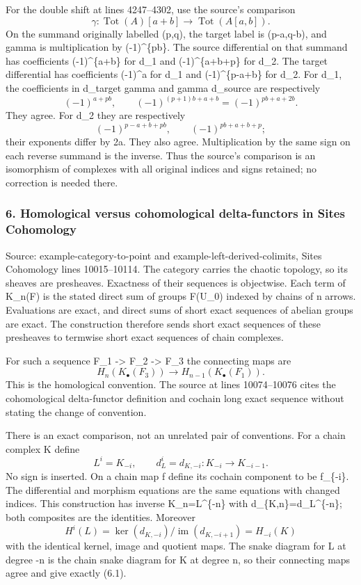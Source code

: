 \documentclass[11pt]{article}
\begin{document}
For the double shift at lines 4247--4302, use the source's comparison \[
\gamma:\operatorname{Tot}(A)[a+b]
\longrightarrow \operatorname{Tot}(A[a,b]).
\] On the summand originally labelled (p,q), the target label is (p-a,q-b), and gamma is multiplication by (-1)\^{}\{pb\}. The source differential on that summand has coefficients (-1)\^{}\{a+b\} for d\_1 and (-1)\^{}\{a+b+p\} for d\_2. The target differential has coefficients (-1)\^{}a for d\_1 and (-1)\^{}\{p-a+b\} for d\_2. For d\_1, the coefficients in d\_target gamma and gamma d\_source are respectively \[
(-1)^{a+pb},\qquad
(-1)^{(p+1)b+a+b}=(-1)^{pb+a+2b}.
\] They agree. For d\_2 they are respectively \[
(-1)^{p-a+b+pb},\qquad
(-1)^{pb+a+b+p};
\] their exponents differ by 2a. They also agree. Multiplication by the same sign on each reverse summand is the inverse. Thus the source's comparison is an isomorphism of complexes with all original indices and signs retained; no correction is needed there.

\subsubsection{6. Homological versus cohomological delta-functors in Sites Cohomology}\label{homological-versus-cohomological-delta-functors-in-sites-cohomology}

Source: example-category-to-point and example-left-derived-colimits, Sites Cohomology lines 10015--10114. The category carries the chaotic topology, so its sheaves are presheaves. Exactness of their sequences is objectwise. Each term of K\_n(F) is the stated direct sum of groups F(U\_0) indexed by chains of n arrows. Evaluations are exact, and direct sums of short exact sequences of abelian groups are exact. The construction therefore sends short exact sequences of these presheaves to termwise short exact sequences of chain complexes.

For such a sequence F\_1 -\textgreater{} F\_2 -\textgreater{} F\_3 the connecting maps are \[
H_n(K_\bullet(F_3))\longrightarrow H_{n-1}(K_\bullet(F_1)).
                                                               \tag{6.1}
\] This is the homological convention. The source at lines 10074--10076 cites the cohomological delta-functor definition and cochain long exact sequence without stating the change of convention.

There is an exact comparison, not an unrelated pair of conventions. For a chain complex K define \[
L^i=K_{-i},\qquad d_L^i=d_{K,-i}:K_{-i}\longrightarrow K_{-i-1}.
\] No sign is inserted. On a chain map f define its cochain component to be f\_\{-i\}. The differential and morphism equations are the same equations with changed indices. This construction has inverse K\_n=L\^{}\{-n\} with d\_\{K,n\}=d\_L\^{}\{-n\}; both composites are the identities. Moreover \[
H^i(L)=
\ker(d_{K,-i})/\operatorname{im}(d_{K,-i+1})
=H_{-i}(K)
\] with the identical kernel, image and quotient maps. The snake diagram for L at degree -n is the chain snake diagram for K at degree n, so their connecting maps agree and give exactly (6.1).
\end{document}
